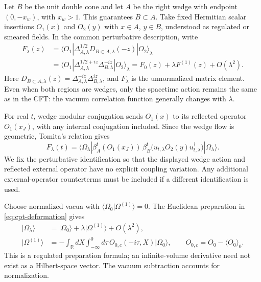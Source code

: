 \documentclass[a4paper,11pt]{article}
\theoremstyle{definition}
\begin{document}
Let $B$ be the unit double cone and let $A$ be the right wedge with endpoint $(0,-x_w)$, with $x_w>1$. This guarantees $B\subset A$. Take fixed Hermitian scalar insertions $O_1(x)$ and $O_2(y)$ with $x\in A$, $y\in B$, understood as regulated or smeared fields. In the common perturbative description, write
\begin{align}
 F_\lambda(z)&=\langle O_1|\Delta_{A,\lambda}^{1/2}
 D_{B\subset A,\lambda}(-z)|O_2\rangle_\lambda\nonumber\\
 &=\langle O_1|\Delta_{A,\lambda}^{1/2+iz}
 \Delta_{B,\lambda}^{-iz}|O_2\rangle_\lambda
 =F_0(z)+\lambda F^{(1)}(z)+O(\lambda^2).
 \label{eq:cpt-characteristic-expansion}
\end{align}
Here $D_{B\subset A,\lambda}(z)=\Delta_{A,\lambda}^{-iz}\Delta_{B,\lambda}^{iz}$, and $F_\lambda$ is the unnormalized matrix element. Even when both regions are wedges, only the spacetime action remains the same as in the CFT: the vacuum correlation function generally changes with $\lambda$.

For real $t$, wedge modular conjugation sends $O_1(x)$ to its reflected operator $O_1(x_J)$, with any internal conjugation included. Since the wedge flow is geometric, Tomita's relation gives
\begin{equation}
 F_\lambda(t)=\langle\Omega_\lambda|
 \beta_A^t(O_1(x_J))\,
 \beta_B^t\bigl(u_{t,\lambda}O_2(y)u_{t,\lambda}^\dagger\bigr)
 |\Omega_\lambda\rangle.
 \label{eq:cpt-real-characteristic}
\end{equation}
We fix the perturbative identification so that the displayed wedge action and reflected external operator have no explicit coupling variation. Any additional external-operator counterterms must be included if a different identification is used.

Choose normalized vacua with $\langle\Omega_0|\Omega^{(1)}\rangle=0$. The Euclidean preparation in \eqref{eq:cpt-deformation} gives
\begin{align}
 |\Omega_\lambda\rangle&=|\Omega_0\rangle+\lambda|\Omega^{(1)}\rangle+O(\lambda^2),\nonumber\\
 |\Omega^{(1)}\rangle&=-\int_{\mathbb R}dX\int_{-\infty}^0d\tau\,
 O_{0,c}(-i\tau,X)|\Omega_0\rangle,
 \qquad O_{0,c}=O_0-\langle O_0\rangle_0.
 \label{eq:cpt-vacuum-variation}
\end{align}
This is a regulated preparation formula; an infinite-volume derivative need not exist as a Hilbert-space vector. The vacuum subtraction accounts for normalization.
\end{document}
